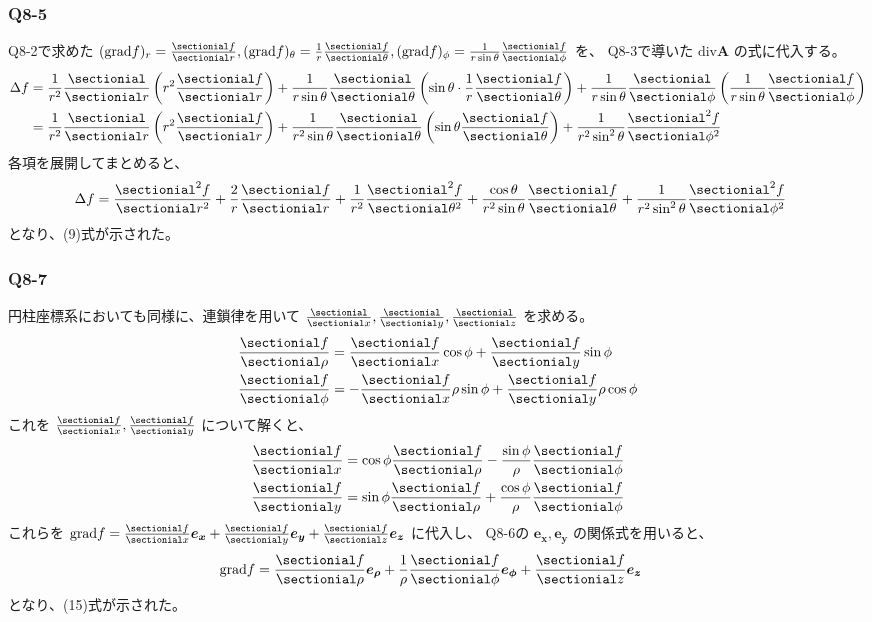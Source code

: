 \documentclass[platex,dvipdfmx,a4paper]{jsarticle}
\newcommand{\hb}[2]{\frac{\sectionial #1}{\sectionial #2}}
\newcommand{\vect}[1]{\boldsymbol{#1}}
\begin{document}
  \subsubsection*{Q8-5}
  Q8-2で求めた $(\text{grad} f)_r = \hb{f}{r}, (\text{grad} f)_\theta = \frac{1}{r}\hb{f}{\theta}, (\text{grad} f)_\phi = \frac{1}{r\sin{\theta}}\hb{f}{\phi}$ を、
  Q8-3で導いた $\text{div} \vect{A}$ の式に代入する。
  \begin{align*}
    \Delta f &= \frac{1}{r^2}\hb{}{r}\left( r^2 \hb{f}{r} \right) + \frac{1}{r\sin{\theta}}\hb{}{\theta}\left( \sin{\theta} \cdot \frac{1}{r}\hb{f}{\theta} \right) + \frac{1}{r\sin{\theta}}\hb{}{\phi}\left( \frac{1}{r\sin{\theta}}\hb{f}{\phi} \right) \\
    &= \frac{1}{r^2}\hb{}{r}\left( r^2 \hb{f}{r} \right) + \frac{1}{r^2 \sin{\theta}}\hb{}{\theta}\left( \sin{\theta}\hb{f}{\theta} \right) + \frac{1}{r^2 \sin^2{\theta}}\hb{^2 f}{\phi^2}
  \end{align*}
  各項を展開してまとめると、
  \begin{align*}
    \Delta f &= \hb{^2 f}{r^2} + \frac{2}{r}\hb{f}{r} + \frac{1}{r^2}\hb{^2 f}{\theta^2} + \frac{\cos{\theta}}{r^2 \sin{\theta}}\hb{f}{\theta} + \frac{1}{r^2 \sin^2{\theta}}\hb{^2 f}{\phi^2}
  \end{align*}
  となり、(9)式が示された。

  \subsubsection*{Q8-7}
  円柱座標系においても同様に、連鎖律を用いて $\hb{}{x}, \hb{}{y}, \hb{}{z}$ を求める。
  \begin{align*}
    \hb{f}{\rho} &= \hb{f}{x}\cos{\phi} + \hb{f}{y}\sin{\phi} \\
    \hb{f}{\phi} &= -\hb{f}{x}\rho\sin{\phi} + \hb{f}{y}\rho\cos{\phi}
  \end{align*}
  これを $\hb{f}{x}, \hb{f}{y}$ について解くと、
  \begin{align*}
    \hb{f}{x} &= \cos{\phi}\hb{f}{\rho} - \frac{\sin{\phi}}{\rho}\hb{f}{\phi} \\
    \hb{f}{y} &= \sin{\phi}\hb{f}{\rho} + \frac{\cos{\phi}}{\rho}\hb{f}{\phi}
  \end{align*}
  これらを $\text{grad} f = \hb{f}{x}\vect{e_x} + \hb{f}{y}\vect{e_y} + \hb{f}{z}\vect{e_z}$ に代入し、
  Q8-6の $\vect{e_x}, \vect{e_y}$ の関係式を用いると、
  \begin{align*}
    \text{grad} f &= \hb{f}{\rho}\vect{e_\rho} + \frac{1}{\rho}\hb{f}{\phi}\vect{e_\phi} + \hb{f}{z}\vect{e_z}
  \end{align*}
  となり、(15)式が示された。
\end{document}
